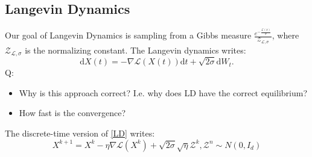 \subsection{Langevin Dynamics}
Our goal of Langevin Dynamics is sampling from a Gibbs measure $\frac{e^{-\frac{\mathcal{L}(x)}{\sigma}}}{\mathcal{Z}_{\mathcal{L},\sigma}}$, where $\mathcal{Z}_{\mathcal{L},\sigma}$ is the normalizing constant.
The Langevin dynamics writes:
\begin{equation}
    \mathrm{d}X(t) = -\nabla\mathcal{L}(X(t))\mathrm{d}t+\sqrt{2\sigma}\mathrm{d} W_t.\tag{LD}
    \label{LD}
\end{equation}
Q: 
\begin{itemize}
    \item Why is this approach correct? I.e. why does LD have the correct equilibrium?
    \item How fast is the convergence?
\end{itemize}

The discrete-time version of \ref{LD} writes:
\begin{equation}
    X^{k+1} = X^k - \eta \nabla \mathcal{L}(X^k) + \sqrt{2\sigma}\sqrt{\eta}\mathcal{Z} ^k,\mathcal{Z}^n\sim N(0,I_d)
\end{equation}

